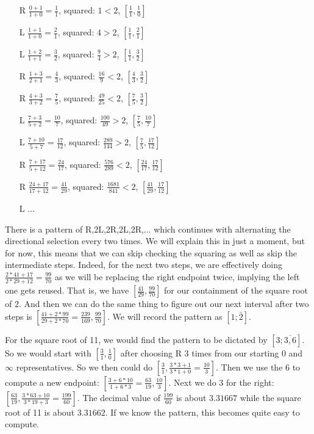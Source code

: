 \documentclass[12pt]{article}
\begin{document}
\begin{itemize}
    \item[R] $\tfrac{0+1}{1+0} = \tfrac{1}{1}$, squared: $1 < 2$,  $[\tfrac{1}{1},\tfrac{1}{0}] $
    \item[L] $\tfrac{1+1}{1+0} = \tfrac{2}{1}$, squared: $4 > 2$, $[\tfrac{1}{1},\tfrac{2}{1}]$
    \item[L] $\tfrac{1+2}{1+1} = \tfrac{3}{2}$, squared: $\tfrac{9}{4} > 2$, $[\tfrac{1}{1},\tfrac{3}{2}]$
    \item[R] $\tfrac{1+3}{2+1} = \tfrac{4}{3}$, squared: $\tfrac{16}{9} < 2$, $[\tfrac{4}{3},\tfrac{3}{2}]$
    \item[R] $\tfrac{4+3}{3+2} = \tfrac{7}{5}$, squared: $\tfrac{49}{25} < 2$, 
    $[\tfrac{7}{5},\tfrac{3}{2}]$
    \item[L] $\tfrac{7+3}{5+2} = \tfrac{10}{7}$, squared: $\tfrac{100}{49} > 2$, 
    $[\tfrac{7}{5},\tfrac{10}{7}]$
    \item[L] $\tfrac{7+10}{5+7} = \tfrac{17}{12}$, squared: $\tfrac{289}{144} > 2$, 
    $[\tfrac{7}{5},\tfrac{17}{12}]$
    \item[R] $\tfrac{7+17}{5+12} = \tfrac{24}{17}$, squared: $\tfrac{576}{289} < 2$, 
    $[\tfrac{24}{17},\tfrac{17}{12}]$
    \item[R] $\tfrac{24+17}{17+12} = \tfrac{41}{29}$, squared: $\tfrac{1681}{841} < 2$, 
    $[\tfrac{41}{29},\tfrac{17}{12}]$
    \item[L] $\ldots$
\end{itemize}

There is a pattern of R,2L,2R,2L,2R,$\ldots$ which continues with alternating the directional selection every two times. We will explain this in just a moment, but for now, this means that we can skip checking the squaring as well as skip the intermediate steps. Indeed, for the next two steps, we are effectively doing $\tfrac{2*41 + 17}{2*29 + 12} = \tfrac{99}{70}$ as we will be replacing the right endpoint twice, implying the left one gets reused. That is, we have $[\tfrac{41}{29}, \tfrac{99}{70}]$ for our containment of the square root of 2. And then we can do the same thing to figure out our next interval after two steps is $[\tfrac{41+2*99}{29+2*70}=\tfrac{239}{169}, \tfrac{99}{70}]$. We will record the pattern as $[1; \bar{2}]$.

For the square root of 11, we would find the pattern to be dictated by $[3;\overline{3,6}]$. So we would start with $[\tfrac{3}{1}, \tfrac{1}{0}]$ after choosing R 3 times from our starting 0 and $\infty$ representatives. So we then could do $[\tfrac{3}{1}, \tfrac{3*3 + 1}{3*1 + 0} = \tfrac{10}{3}]$. Then we use the 6 to compute a new endpoint:  $[\tfrac{3+6*10}{1+6*3} = \tfrac{63}{19}, \tfrac{10}{3}]$. Next we do 3 for the right:  $[\tfrac{63}{19}, \tfrac{3*63+10}{3*19+3} = \tfrac{199}{60}]$. The decimal value of $\tfrac{199}{60}$ is about $3.31667$ while the square root of 11 is about $3.31662$. If we know the pattern, this becomes quite easy to compute. 
\end{document}
